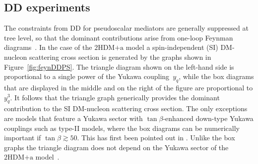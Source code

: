 \documentclass[a4paper, 11pt,notoc]{article}
\newcommand{\hdma}{\ensuremath{\textrm{2HDM+a}}\xspace}
\begin{document}
\subsection{DD experiments}

The constraints from DD for pseudoscalar mediators are generally suppressed at tree level, so that the dominant contributions arise from one-loop Feynman diagrams~\cite{Ipek:2014gua,Arcadi:2017wqi,Sanderson:2018lmj,Li:2018qip}. In the case of the \hdma model a spin-independent (SI) DM-nucleon  scattering cross section is generated by the graphs shown in Figure~\ref{fig:feynDDPS}. The triangle diagram shown on the left-hand side  is proportional to a single power of the Yukawa coupling~$y_q$, while the box diagrams that are displayed in the middle and on the right of the figure  are proportional to $y_q^3$. It follows that the triangle graph generically provides the dominant contribution to the SI DM-nucleon  scattering cross section. The only exceptions are models that feature a Yukawa sector with  $\tan \beta$-enhanced down-type Yukawa couplings such as type-II models, where the box diagrams can be numerically important if $\tan\beta\gtrsim50$. This has first been pointed out in \cite{Ipek:2014gua}. Unlike the box graphs the triangle diagram does not depend on the Yukawa sector of the \hdma model~\cite{Arcadi:2017wqi,Sanderson:2018lmj}.
\end{document}
